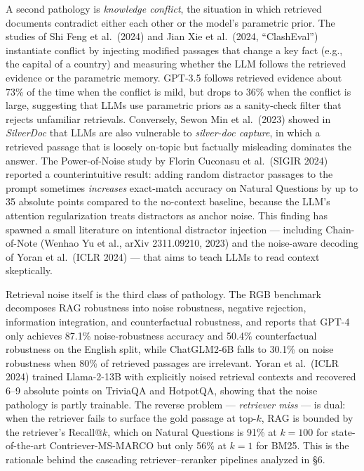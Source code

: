 \documentclass{article}
\begin{document}
A second pathology is \emph{knowledge conflict}, the situation in which retrieved documents contradict either each other or the model's parametric prior. The studies of Shi Feng et al.~(2024) and Jian Xie et al.~(2024, ``ClashEval'') instantiate conflict by injecting modified passages that change a key fact (e.g., the capital of a country) and measuring whether the LLM follows the retrieved evidence or the parametric memory. GPT-3.5 follows retrieved evidence about 73\% of the time when the conflict is mild, but drops to 36\% when the conflict is large, suggesting that LLMs use parametric priors as a sanity-check filter that rejects unfamiliar retrievals. Conversely, Sewon Min et al.~(2023) showed in \emph{SilverDoc} that LLMs are also vulnerable to \emph{silver-doc capture}, in which a retrieved passage that is loosely on-topic but factually misleading dominates the answer. The Power-of-Noise study by Florin Cuconasu et al.~(SIGIR 2024) reported a counterintuitive result: adding random distractor passages to the prompt sometimes \emph{increases} exact-match accuracy on Natural Questions by up to 35 absolute points compared to the no-context baseline, because the LLM's attention regularization treats distractors as anchor noise. This finding has spawned a small literature on intentional distractor injection --- including Chain-of-Note (Wenhao Yu et al., arXiv 2311.09210, 2023) and the noise-aware decoding of Yoran et al.~(ICLR 2024) --- that aims to teach LLMs to read context skeptically.

Retrieval noise itself is the third class of pathology. The RGB benchmark \citep{chen2024benchmarkinglargel} decomposes RAG robustness into noise robustness, negative rejection, information integration, and counterfactual robustness, and reports that GPT-4 only achieves 87.1\% noise-robustness accuracy and 50.4\% counterfactual robustness on the English split, while ChatGLM2-6B falls to 30.1\% on noise robustness when 80\% of retrieved passages are irrelevant. Yoran et al.~(ICLR 2024) trained Llama-2-13B with explicitly noised retrieval contexts and recovered 6--9 absolute points on TriviaQA and HotpotQA, showing that the noise pathology is partly trainable. The reverse problem --- \emph{retriever miss} --- is dual: when the retriever fails to surface the gold passage at top-\(k\), RAG is bounded by the retriever's Recall@\(k\), which on Natural Questions is 91\% at \(k=100\) for state-of-the-art Contriever-MS-MARCO but only 56\% at \(k=1\) for BM25. This is the rationale behind the cascading retriever--reranker pipelines analyzed in §6.
\end{document}
